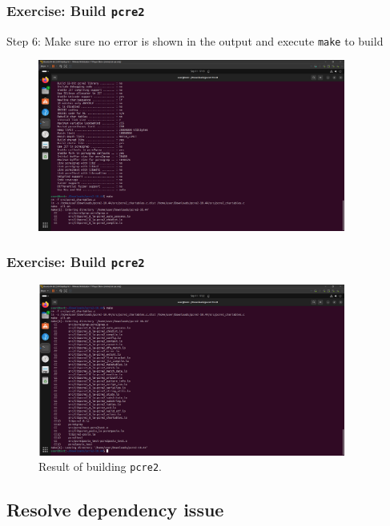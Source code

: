 \begin{frame}
    \frametitle{Exercise: Build \texttt{pcre2}}

    Step 6: Make sure no error is shown in the output and execute \texttt{make} to build

    \begin{figure}[H]
        \centering
        \includegraphics[width=0.9\textwidth]{../figure/pcre2_build_6.png}
    \end{figure}

\end{frame}

\begin{frame}
    \frametitle{Exercise: Build \texttt{pcre2}}

    \begin{figure}[H]
        \centering
        \includegraphics[width=0.9\textwidth]{../figure/pcre2_build_7.png}
        \caption*{Result of building \texttt{pcre2}.}
    \end{figure}

\end{frame}

\subsection{Resolve dependency issue}

